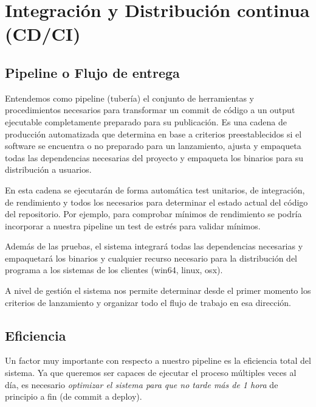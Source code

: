 
\section{Integración y Distribución continua (CD/CI)}\label{pipeline:entrega-continua}

\subsection{Pipeline o Flujo de entrega}\label{pipeline:flujo-de-entrega}

Entendemos como pipeline (tubería) el conjunto de herramientas y procedimientos
necesarios para transformar un commit de código a un output ejecutable
completamente preparado para su publicación. Es una cadena de producción
automatizada que determina en base a criterios preestablecidos si el software
se encuentra o no preparado para un lanzamiento, ajusta y empaqueta todas las
dependencias necesarias del proyecto y empaqueta los binarios para su
distribución a usuarios.

En esta cadena se ejecutarán de forma automática test unitarios, de
integración, de rendimiento y todos los necesarios para determinar el estado
actual del código del repositorio. Por ejemplo, para comprobar mínimos de
rendimiento se podría incorporar a nuestra pipeline un test de estrés para
validar  mínimos.

Además de las pruebas, el sistema integrará todas las dependencias necesarias y
empaquetará los binarios y cualquier recurso necesario para la distribución del
programa a los sistemas de los clientes (win64, linux, osx).

A nivel de gestión el sistema nos permite determinar desde el primer momento
los criterios de lanzamiento y organizar todo el flujo de trabajo en esa
dirección.

\subsection{Eficiencia}\label{pipeline:eficiencia}

Un factor muy importante con respecto a nuestro pipeline es la eficiencia total
del sistema. Ya que queremos ser capaces de ejecutar el proceso múltiples veces
al día, es necesario \emph{optimizar el sistema para que no tarde más de 1
hora} de principio a fin (de commit a deploy).


